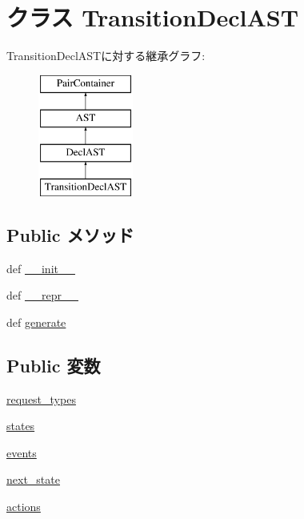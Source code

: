 \hypertarget{classslicc_1_1ast_1_1TransitionDeclAST_1_1TransitionDeclAST}{
\section{クラス TransitionDeclAST}
\label{classslicc_1_1ast_1_1TransitionDeclAST_1_1TransitionDeclAST}
}
TransitionDeclASTに対する継承グラフ:\begin{figure}[H]
\begin{center}
\leavevmode
\includegraphics[height=4cm]{classslicc_1_1ast_1_1TransitionDeclAST_1_1TransitionDeclAST}
\end{center}
\end{figure}
\subsection*{Public メソッド}
\begin{DoxyCompactItemize}
\item 
def \hyperlink{classslicc_1_1ast_1_1TransitionDeclAST_1_1TransitionDeclAST_ac775ee34451fdfa742b318538164070e}{\_\-\_\-init\_\-\_\-}
\item 
def \hyperlink{classslicc_1_1ast_1_1TransitionDeclAST_1_1TransitionDeclAST_ad8b9328939df072e4740cd9a63189744}{\_\-\_\-repr\_\-\_\-}
\item 
def \hyperlink{classslicc_1_1ast_1_1TransitionDeclAST_1_1TransitionDeclAST_a4555d1cee0dccf3942ea35fe86de2e8e}{generate}
\end{DoxyCompactItemize}
\subsection*{Public 変数}
\begin{DoxyCompactItemize}
\item 
\hyperlink{classslicc_1_1ast_1_1TransitionDeclAST_1_1TransitionDeclAST_a11a77bd4543c82e1dd96d60507dc74d2}{request\_\-types}
\item 
\hyperlink{classslicc_1_1ast_1_1TransitionDeclAST_1_1TransitionDeclAST_aa19be6305a5a4485e1e70de70ed7d677}{states}
\item 
\hyperlink{classslicc_1_1ast_1_1TransitionDeclAST_1_1TransitionDeclAST_ad29858f6d8ab73f2970f41cb21a76b84}{events}
\item 
\hyperlink{classslicc_1_1ast_1_1TransitionDeclAST_1_1TransitionDeclAST_a677bf607ba7e177c026a1c8eb292d293}{next\_\-state}
\item 
\hyperlink{classslicc_1_1ast_1_1TransitionDeclAST_1_1TransitionDeclAST_af806efc6052edbc741683ec893bb2fe1}{actions}
\end{DoxyCompactItemize}


